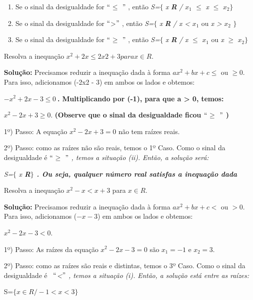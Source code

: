 \begin{caixa}
\begin{enumerate}
	\item Se o sinal da desigualdade for $``$\textit{$ \leq $ }$"$ , então \textit{S=}$ \{ $ \textit{x } \textbf{\textit{R }}\textit{/ $x_{1}$ $ \leq $  x $ \leq $  \textbf{ }$x_{2}$}$ \} $ 

	\item Se o sinal da desigualdade for $``$>$"$ , então \textit{S=}$ \{ $ \textit{x } \textbf{\textit{R }}\textit{/ x < $x_{1}$} ou \textit{x >\textbf{ }$x_{2}$} $ \} $ 

	\item  Se o sinal da desigualdade for $``$\textit{$ \geq $ }$"$ , então \textit{S=}$ \{ $ \textit{x } \textbf{\textit{R }}\textit{/ x $ \leq $ $x_{1}$} ou\textit{ x $ \geq $ $x_{2}$}$ \} $ 
\end{enumerate}

\end{caixa}

\begin{texemplo}
Resolva a inequação $x^{2} +2 x \leq 2x2+3 para x \in R$.

\textbf{Solução:} Precisamos reduzir a inequação dada à forma $ax^{2} + bx + c \leq$ ou $\geq 0$. Para isso, adicionamos (-2x2 - 3) em ambos os lados e obtemos:

\textbf{$-x^{2} + 2x - 3 \leq 0~$. Multiplicando por (-1), para que a > 0, temos:}

$x^{2} - 2x + 3 \geq 0$. \textbf{(Observe que o sinal da desigualdade ficou $``$$ \geq $ $"$ )}

1º) Passo: A equação  $x^{2} - 2x + 3 = 0$ não tem raízes reais.

2º) Passo: como as raízes não são reais, temos o 1º Caso. Como o sinal da desigualdade é  $``$\textit{$ \geq $ $"$ , temos a situação (ii). Então, a solução será:}

\textit{S=$ \{ $ x  \textbf{R$ \} $ . Ou seja, qualquer número real satisfas a inequação dada \qedsymbol{}}}
\end{texemplo}

\begin{texemplo}
    Resolva a inequação $x^{2} - x < x+3$ para $x \in R$.

\textbf{Solução:} Precisamos reduzir a inequação dada à forma $ax^{2} + bx + c <$ ou $> 0$. Para isso, adicionamos ($-x-3$) em ambos os lados e obtemos:

\textit{$x^{2} - 2x - 3 < 0$}.

1º) Passo: As raízes da equação  $x^{2} - 2x - 3 = 0$ são $x_{1} = -1$ e  $x_{2} = 3.$

2º) Passo: como as raízes são reais e distintas, temos o 3º Caso. Como o sinal da desigualdade é~ $``$\textit{<$"$ , temos a situação (i). Então, a solução está entre as raízes:}

S=$ \{ x \in R / -1 < x < 3 \} $ \qedsymbol{}
\end{texemplo}

